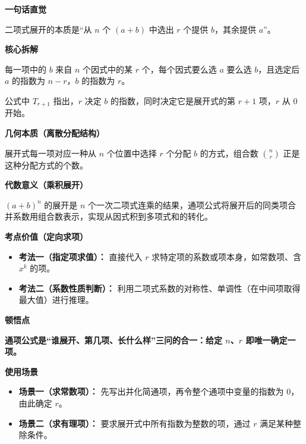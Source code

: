 \begin{explanationbox}
	\textbf{\textcolor{CExplanation}{一句话直觉}}

	二项式展开的本质是“从 $n$ 个 $(a+b)$ 中选出 $r$ 个提供 $b$，其余提供 $a$”。

	\medskip
	\textbf{\textcolor{CExplanation}{核心拆解}}
	\begin{description}[style=nextline, leftmargin=2.8em, labelsep=0.5em, itemsep=0.45em]
		\item[\textbf{要点一（组合选择方式）：}] 每一项中的 $b$ 来自 $n$ 个因式中的某 $r$ 个，每个因式要么选 $a$ 要么选 $b$，且选定后 $a$ 的指数为 $n-r$，$b$ 的指数为 $r$。
		\item[\textbf{要点二（项序与 $r$ 对应）：}] 公式中 $T_{r+1}$ 指出，$r$ 决定 $b$ 的指数，同时决定它是展开式的第 $r+1$ 项，$r$ 从 $0$ 开始。
	\end{description}

	\medskip
	\textbf{\textcolor{CExplanation}{几何本质（离散分配结构）}}

	展开式每一项对应一种从 $n$ 个位置中选择 $r$ 个分配 $b$ 的方式，组合数 $\binom{n}{r}$ 正是这种分配方式的个数。

	\medskip
	\textbf{\textcolor{CExplanation}{代数意义（乘积展开）}}

	$(a+b)^n$ 的展开是 $n$ 个一次二项式连乘的结果，通项公式将展开后的同类项合并系数用组合数表示，实现从因式积到多项式和的转化。

	\medskip
	\textbf{\textcolor{CExplanation}{考点价值（定向求项）}}
	\begin{itemize}[leftmargin=*, itemsep=0.5em, topsep=0.4em]
		\item \textbf{考法一（指定项求值）：} 直接代入 $r$ 求特定项的系数或项本身，如常数项、含 $x^k$ 的项。
		\item \textbf{考法二（系数性质判断）：} 利用二项式系数的对称性、单调性（在中间项取得最大值）进行推理。
	\end{itemize}

	\medskip
	\textbf{\textcolor{CExplanation}{顿悟点}}

	\textbf{通项公式是“谁展开、第几项、长什么样”三问的合一：给定 $n$、$r$ 即唯一确定一项。}

	\medskip
	\textbf{\textcolor{CExplanation}{使用场景}}
	\begin{itemize}[leftmargin=*, itemsep=0.5em, topsep=0.4em]
		\item \textbf{场景一（求常数项）：} 先写出并化简通项，再令整个通项中变量的指数为 $0$，由此确定 $r$。
		\item \textbf{场景二（求有理项）：} 要求展开式中所有指数为整数的项，通过 $r$ 满足某种整除条件。
	\end{itemize}
\end{explanationbox}